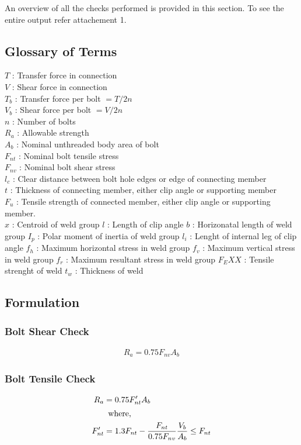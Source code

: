 An overview of all the checks performed is provided in this
section. To see the entire output refer attachement 1.

\subsection{Glossary of Terms}

\(T\) : Transfer force in connection\\
\(V\) : Shear force in connection\\
\(T_b\) : Transfer force per bolt \(=T/2n\)\\
\(V_b\) : Shear force per bolt \(=V/2n\)\\
\(n\) : Number of bolts\\
\(R_a\) : Allowable strength\\
\(A_b\) : Nominal unthreaded body area of bolt\\
\(F_{nt}\) : Nominal bolt tensile stress\\
\(F_{nv}\) : Nominal bolt shear stress\\
\(l_c\) : Clear distance between bolt hole edges or edge of connecting member\\
\(t\) : Thickness of connecting member, either clip angle or supporting member\\
\(F_u\) : Tensile strength of connected member, either clip angle or supporting
member.\\
\(x\) : Centroid of weld group
\(l\) : Length of clip angle
\(b\) : Horizonatal length of weld group
\(I_p\) : Polar moment of inertia of weld group
\(l_i\) : Lenght of internal leg of clip angle
\(f_h\) : Maximum horizontal stress in weld group
\(f_v\) : Maximum vertical stress in weld group
\(f_r\) : Maximum resultant stress in weld group
\(F_EXX\) : Tensile strenght of weld
\(t_w\) : Thickness of weld


\subsection{Formulation}
\subsubsection{Bolt Shear Check}
\begin{align}
    R_a = 0.75 F_{nv} A_b
\end{align}
\subsubsection{Bolt Tensile Check}
\begin{align}
    R_a &= 0.75 F'_{nt} A_b\\ 
    \intertext{\quad \quad where,} \notag  
    F'_{nt} &= 1.3 F_{nt} - \frac{F_{nt}}{0.75 F_{nv}} \frac{V_b}{A_b}\leq F_{nt}
    \notag
\end{align}
